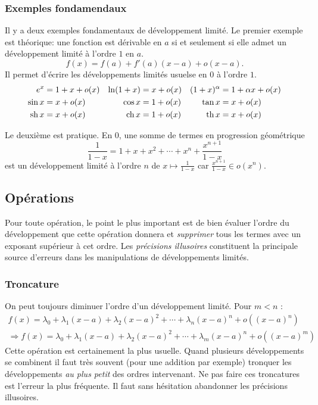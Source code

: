 \subsubsection{Exemples fondamendaux}
Il y a deux exemples fondamentaux de développement limité. Le premier exemple est théorique: une fonction est dérivable en $a$ si et seulement si elle admet un développement limité à l'ordre $1$ en $a$.
\begin{displaymath}
  f(x) = f(a) + f'(a)(x-a) + o(x-a).
\end{displaymath}
Il permet d'écrire les développements limités usuelse en $0$ à l'ordre $1$.
\[
  \begin{aligned}
    e^x &= 1 + x + o(x) & \ln(1 + x) &= x + o(x) & (1+x)^\alpha &= 1 + \alpha x + o(x)\\
    \sin x &= x + o(x)  & \cos x &= 1 + o(x)     & \tan x  &= x + o(x) \\
    \mathop{\mathrm{sh}} x &= x + o(x)  & \mathop{\mathrm{ch}} x &= 1 + o(x)     & \mathop{\mathrm{th}} x  &= x + o(x) 
  \end{aligned}
\]

Le deuxième est pratique. En $0$, une somme de termes en progression géométrique
\begin{displaymath}
 \frac{1}{1-x}=1+x+x^2+\cdots+x^n+\frac{x^{n+1}}{1-x}
\end{displaymath}
est un développement limité à l'ordre $n$ de $x\mapsto \frac{1}{1-x}$ car $\frac{x^{n+1}}{1-x}\in o\left(x^n\right)$. 
\subsection{Opérations}
Pour toute opération, le point le plus important est de bien évaluer l'ordre du développement que cette opération donnera et \emph{supprimer} tous les termes avec un exposant supérieur à cet ordre. Les \emph{précisions illusoires} constituent la principale source d'erreurs dans les manipulations de développements limités.
\subsubsection{Troncature}
On peut toujours diminuer l'ordre d'un développement limité. Pour $m<n$ :
\begin{multline*}
 f(x)= \lambda_0 + \lambda_1(x-a)+ \lambda_2(x-a)^2+\cdots+ \lambda_n(x-a)^n+o((x-a)^n)\\
\Rightarrow f(x)= \lambda_0 + \lambda_1(x-a)+ \lambda_2(x-a)^2+\cdots+ \lambda_m(x-a)^n+o((x-a)^m)
\end{multline*}
Cette opération est certainement la plus usuelle. Quand plusieurs développements se combinent il faut très souvent (pour une addition par exemple) tronquer les développements \emph{au plus petit} des ordres intervenant. Ne pas faire ces troncatures est l'erreur la plus fréquente. Il faut sans hésitation abandonner les précisions illusoires.

